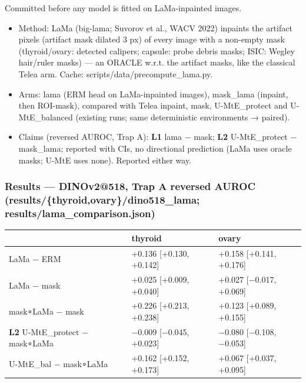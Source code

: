 {\small
Committed before any model is fitted on LaMa-inpainted images.

\begin{itemize}

\item
  Method: LaMa (big-lama; Suvorov et al., WACV 2022) inpaints the artifact pixels (artifact mask dilated 3 px) of
  every image with a non-empty mask (thyroid/ovary: detected calipers; capsule: probe debris masks; ISIC: Wegley
  hair/ruler masks) --- an ORACLE w.r.t. the artifact masks, like the classical Telea arm. Cache:
  scripts/data/precompute\_lama.py.
\item
  Arms: lama (ERM head on LaMa-inpainted images), mask\_lama (inpaint, then ROI-mask), compared with Telea inpaint,
  mask, U-MtE\_protect and U-MtE\_balanced (existing runs; same deterministic environments → paired).
\item
  Claims (reversed AUROC, Trap A): \textbf{L1} lama − mask; \textbf{L2} U-MtE\_protect − mask\_lama; reported with CIs, no
  directional prediction (LaMa uses oracle masks; U-MtE uses none). Reported either way.
\end{itemize}

\subsubsection{Results --- DINOv2@518, Trap A reversed AUROC (results/\{thyroid,ovary\}/dino518\_lama; results/lama\_comparison.json)}\label{results--dinov2518-trap-a-reversed-auroc-resultsthyroidovarydino518_lama-resultslama_comparisonjson}

{ %
\begin{longtable}[]{@{}lll@{}}
\toprule\noalign{}
& thyroid & ovary \\
\midrule\noalign{}
\endhead
\bottomrule\noalign{}
\endlastfoot
LaMa − ERM & +0.136 {[}+0.130, +0.142{]} & +0.158 {[}+0.141, +0.176{]} \\
LaMa − mask & +0.025 {[}+0.009, +0.040{]} & +0.027 {[}−0.017, +0.069{]} \\
mask∘LaMa − mask & +0.226 {[}+0.213, +0.238{]} & +0.123 {[}+0.089, +0.155{]} \\
\textbf{L2} U-MtE\_protect − mask∘LaMa & −0.009 {[}−0.045, +0.023{]} & −0.080 {[}−0.108, −0.053{]} \\
U-MtE\_bal − mask∘LaMa & +0.162 {[}+0.152, +0.173{]} & +0.067 {[}+0.037, +0.095{]} \\
\end{longtable}
}

}
